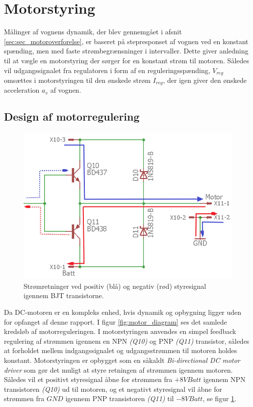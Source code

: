 \section{Motorstyring }\label{sec:sec_motorstyring}
Målinger af vognens dynamik, der blev gennemgået i afsnit \ref{sec:sec_motoroverforelse}, er baseret på stepresponset af vognen ved en konstant spænding, men med faste strømbegrænsninger i intervaller.
Dette giver anledning til at vægle en motorstyring der sørger for en konstant strøm til motoren.
Således vil udgangssignalet fra regulatoren i form af en reguleringsspænding, $V_{reg}$ omsættes i motorstyringen til den ønskede strøm $I_{reg}$, der igen giver den ønskede acceleration $a_v$ af vognen.  

\subsection{Design af motorregulering}
\begin{figure}
	\centering
	\includegraphics[width=.45\textwidth]{billeder/motor_bidirectional.png}
	\caption{Strømretninger ved positiv (blå) og negativ (rød) styresignal igennem BJT transistorne.}
	\label{fig:motor_bidirectional}
\end{figure}
Da DC-motoren er en kompleks enhed, hvis dynamik og opbygning ligger uden for opfanget af denne rapport. 
I figur \ref{fig:motor_diagram} ses det samlede kredsløb af motorreguleringen.
I motorstyringen anvendes en simpel feedback regulering af strømmen igennem en NPN \emph{(Q10)} og PNP \emph{(Q11)} transistor, således at forholdet mellem indgangssignalet og udgangsstrømmen til motoren holdes konstant.
Motorstyringen er opbygget som en såkaldt \textit{ Bi-directional DC motor driver} som gør det muligt at styre retningen af strømmen igennem motoren.
Således vil et positivt styresignal åbne for strømmen fra $+8V Batt$ igennem NPN transistoren \emph{(Q10)} ud til motoren, og et negativt styresignal vil åbne for strømmen fra $GND$ igennem PNP transistoren \emph{(Q11)} til $-8V Batt$, se figur \ref{fig:motor_bidirectional}.

